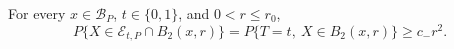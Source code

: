 For every \(x\in\mathcal B_P\), \(t\in\{0,1\}\), and
\(0<r\leq r_0\),
\[
 P\{X\in\mathcal E_{t,P}\cap B_2(x,r)\}
 =P\{T=t,\ X\in B_2(x,r)\}\geq c_-r^2.
\]